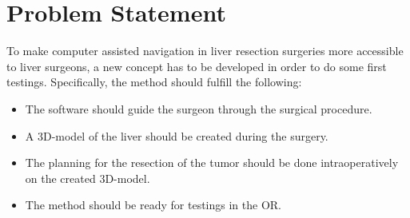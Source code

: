 \chapter{Problem Statement}
To make computer assisted navigation in liver resection surgeries more
accessible to liver surgeons, a new concept has to be developed in order to do
some first testings.
Specifically, the method should fulfill the following:
\begin{itemize}
  \item The software should guide the surgeon through the surgical procedure.
  \item A 3D-model of the liver should be created during the surgery.
  \item The planning for the resection of the tumor should be done
    intraoperatively on the created 3D-model.
  \item The method should be ready for testings in the OR.
\end{itemize}
\endinput
